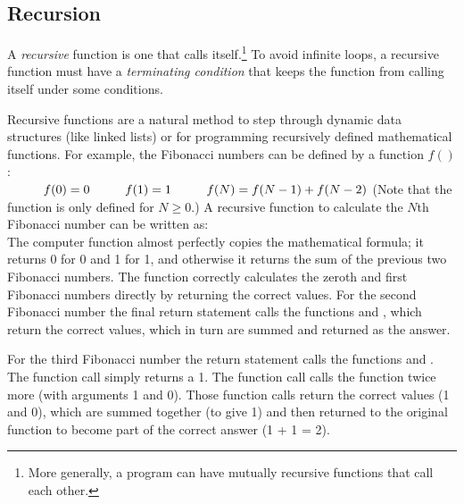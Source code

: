 \subsection{Recursion}

A \emph{recursive} function is one that calls itself.\footnote{More generally, a program can have mutually recursive functions that call each other.}  To avoid infinite loops, a recursive function must have a \emph{terminating condition} that keeps the function from calling itself under some conditions.

Recursive functions are a natural method to step through dynamic data structures (like linked lists) or for programming recursively defined mathematical functions.  For example, the Fibonacci numbers can be defined by a function $f()$:\\
$\hspace*{1cm}f(0) = 0\\
\hspace*{1cm}f(1) = 1\\
\hspace*{1cm}f(N) = f(N-1) + f(N-2)\\$
(Note that the function is only defined for $N \geq 0$.)
A recursive function to calculate the $N$th Fibonacci number can be written as:\\
The computer function almost perfectly copies the mathematical formula; it returns 0 for 0 and 1 for 1, and otherwise it returns the sum of the previous two Fibonacci numbers.  The function correctly calculates the zeroth and first Fibonacci numbers directly by returning the correct values.  For the second Fibonacci number the final return statement calls the functions  and , which return the correct values, which in turn are summed and returned as the answer.

For the third Fibonacci number the return statement calls the functions  and .  The function call  simply returns a 1.  The function call  calls the  function twice more (with arguments 1 and 0).   Those function calls return the correct values (1 and 0), which are summed together (to give 1) and then returned to the original  function to become part of the correct answer (1 + 1 = 2).  

